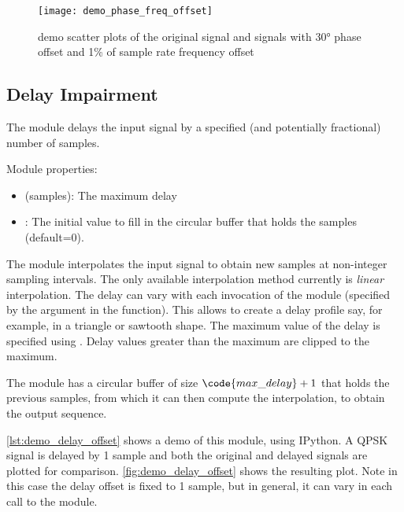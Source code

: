 \begin{figure}[H]
  \centering
  \texttt{[image: demo\_phase\_freq\_offset]}
  \caption{ demo scatter plots of the original signal and signals with 30° phase offset and 1\% of sample rate frequency offset}
  \label{fig:demo_phase_freq_offset}
\end{figure}

\subsection{Delay Impairment}

The  module delays the input signal by a specified (and potentially fractional) number of samples.

\noindent Module properties:
\begin{itemize}
  \item {} (samples): The maximum delay
  \item {}: The initial value to fill in the circular buffer that holds the samples (default=0).
\end{itemize}

The module interpolates the input signal to obtain new samples at non-integer sampling intervals. The only available interpolation method currently is \emph{linear} interpolation. The delay can vary with each invocation of the module (specified by the  argument in the  function). This allows to create a delay profile say, for example, in a triangle or sawtooth shape. The maximum value of the delay is specified using . Delay values greater than the maximum are clipped to the maximum.

The module has a circular buffer of size $\code{max\_delay}+1$ that holds the previous samples, from which it can then compute the interpolation, to obtain the output sequence.

\autoref{lst:demo_delay_offset} shows a demo of this module, using IPython. A QPSK signal is delayed by 1 sample and both the original and delayed signals are plotted for comparison. \autoref{fig:demo_delay_offset} shows the resulting plot. Note in this case the delay offset is fixed to 1 sample, but in general, it can vary in each call to the module.

